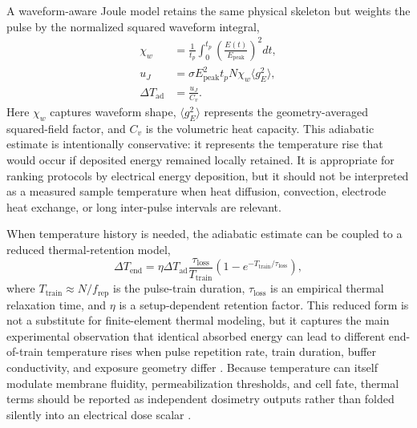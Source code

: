 A waveform-aware Joule model retains the same physical skeleton but weights the pulse by the normalized squared waveform integral,
\begin{align}
\chi_w &= \frac{1}{t_p}\int_0^{t_p}\left(\frac{E(t)}{E_{\mathrm{peak}}}\right)^2dt,\\
u_J &= \sigma E_{\mathrm{peak}}^{2}t_pN\chi_w\langle g_E^2\rangle,\\
\Delta T_{\mathrm{ad}} &= \frac{u_J}{C_v}.
\end{align}
Here $\chi_w$ captures waveform shape, $\langle g_E^2\rangle$ represents the geometry-averaged squared-field factor, and $C_v$ is the volumetric heat capacity. This adiabatic estimate is intentionally conservative: it represents the temperature rise that would occur if deposited energy remained locally retained. It is appropriate for ranking protocols by electrical energy deposition, but it should not be interpreted as a measured sample temperature when heat diffusion, convection, electrode heat exchange, or long inter-pulse intervals are relevant.

When temperature history is needed, the adiabatic estimate can be coupled to a reduced thermal-retention model,
\begin{equation}
\Delta T_{\mathrm{end}}=\eta\Delta T_{\mathrm{ad}}
\frac{\tau_{\mathrm{loss}}}{T_{\mathrm{train}}}
\left(1-e^{-T_{\mathrm{train}}/\tau_{\mathrm{loss}}}\right),
\end{equation}
where $T_{\mathrm{train}}\approx N/f_{\mathrm{rep}}$ is the pulse-train duration, $\tau_{\mathrm{loss}}$ is an empirical thermal relaxation time, and $\eta$ is a setup-dependent retention factor. This reduced form is not a substitute for finite-element thermal modeling, but it captures the main experimental observation that identical absorbed energy can lead to different end-of-train temperature rises when pulse repetition rate, train duration, buffer conductivity, and exposure geometry differ \cite{orlacchio2023effects,gudvangen2022electroporation}. Because temperature can itself modulate membrane fluidity, permeabilization thresholds, and cell fate, thermal terms should be reported as independent dosimetry outputs rather than folded silently into an electrical dose scalar \cite{kanduser2008temperature,song2011synergistic,song2017thermal,yan2021synergistic,pakhomova2013two}.

